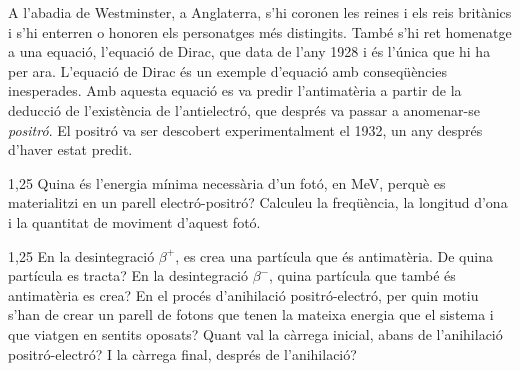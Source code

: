 A l'abadia de Westminster, a Anglaterra, s'hi coronen les reines i els reis britànics i s'hi enterren o honoren els personatges més distingits. També s'hi ret homenatge a una equació, l'equació de Dirac, que data de l'any 1928 i és l'única que hi ha per ara. L'equació de Dirac és un exemple d'equació amb conseqüències inesperades. Amb aquesta equació es va predir l'antimatèria a partir de la deducció de l'existència de l'antielectró, que després va passar a anomenar-se \textit{positró}. El positró va ser descobert experimentalment el 1932, un any després d'haver estat predit.

\begin{apartat}{1,25}
Quina és l'energia mínima necessària d'un fotó, en MeV, perquè es materialitzi en un parell electró-positró? Calculeu la freqüència, la longitud d'ona i la quantitat de moviment d'aquest fotó.
\end{apartat}

\begin{apartat}{1,25}
En la desintegració $\beta^+$, es crea una partícula que és antimatèria. De quina partícula es tracta? En la desintegració $\beta^-$, quina partícula que també és antimatèria es crea? En el procés d'anihilació positró-electró, per quin motiu s'han de crear un parell de fotons que tenen la mateixa energia que el sistema i que viatgen en sentits oposats? Quant val la càrrega inicial, abans de l'anihilació positró-electró? I la càrrega final, després de l'anihilació?
\end{apartat}

